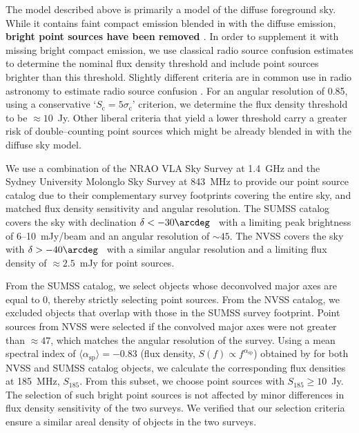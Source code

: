 \documentclass[preprint2,iop,numberedappendix]{emulateapj}
\begin{document}
The model described above is primarily a model of the diffuse foreground sky. While it contains faint compact emission blended in with the diffuse emission, {\bf bright point sources have been removed \citep{deo08}}. In order to supplement it with missing bright compact emission, we use classical radio source confusion estimates to determine the nominal flux density threshold and include point sources brighter than this threshold. Slightly different criteria are in common use in radio astronomy to estimate radio source confusion \citep[see Appendix of][and references therein]{thy13}. For an angular resolution of 0.85\arcdeg, using a conservative `$S_\textrm{c}=5\sigma_\textrm{c}$' criterion, we determine the flux density threshold to be $\approx 10$~Jy. Other liberal criteria that yield a lower threshold carry a greater risk of double--counting point sources which might be already blended in with the diffuse sky model. 

We use a combination of the NRAO VLA Sky Survey \citep[NVSS;][]{con98} at 1.4~GHz and the Sydney University Molonglo Sky Survey \citep[SUMSS;][]{boc99,mau03} at 843~MHz to provide our point source catalog due to their complementary survey footprints covering the entire sky, and matched flux density sensitivity and angular resolution. The SUMSS catalog covers the sky with declination $\delta < -30\arcdeg$~ with a limiting peak brightness of 6--10~mJy/beam and an angular resolution of $\sim 45$\arcsec. The NVSS covers the sky with $\delta > -40\arcdeg$~ with a similar angular resolution and a limiting flux density of $\approx 2.5$~mJy for point sources. 

From the SUMSS catalog, we select objects whose deconvolved major axes are equal to 0\arcsec, thereby strictly selecting point sources. From the NVSS catalog, we excluded objects that overlap with those in the SUMSS survey footprint. Point sources from NVSS were selected if the convolved major axes were not greater than $\approx 47$\arcsec, which matches the angular resolution of the survey. Using a mean spectral index of $\langle\alpha_\textrm{sp}\rangle=-0.83$ (flux density, $S(f)\propto f^{\alpha_\textrm{sp}}$) obtained by \citet{mau03} for both NVSS and SUMSS catalog objects, we calculate the corresponding flux densities at 185~MHz, $S_{185}$. From this subset, we choose point sources with $S_{185}\geq 10$~Jy. The selection of such bright point sources is not affected by minor differences in flux density sensitivity of the two surveys. We verified that our selection criteria ensure a similar areal density of objects in the two surveys. 
\end{document}
